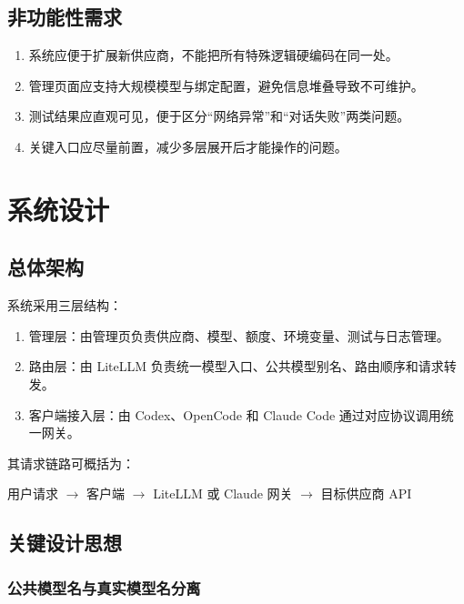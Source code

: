 \documentclass[12pt,a4paper]{ctexart}
\begin{document}
\subsection{非功能性需求}

\begin{enumerate}[label=\arabic*.]
  \item 系统应便于扩展新供应商，不能把所有特殊逻辑硬编码在同一处。
  \item 管理页面应支持大规模模型与绑定配置，避免信息堆叠导致不可维护。
  \item 测试结果应直观可见，便于区分“网络异常”和“对话失败”两类问题。
  \item 关键入口应尽量前置，减少多层展开后才能操作的问题。
\end{enumerate}

\section{系统设计}

\subsection{总体架构}

系统采用三层结构：

\begin{enumerate}[label=\arabic*.]
  \item 管理层：由管理页负责供应商、模型、额度、环境变量、测试与日志管理。
  \item 路由层：由 LiteLLM 负责统一模型入口、公共模型别名、路由顺序和请求转发。
  \item 客户端接入层：由 Codex、OpenCode 和 Claude Code 通过对应协议调用统一网关。
\end{enumerate}

其请求链路可概括为：

\begin{center}
用户请求 $\rightarrow$ 客户端 $\rightarrow$ LiteLLM 或 Claude 网关 $\rightarrow$ 目标供应商 API
\end{center}

\subsection{关键设计思想}

\subsubsection{公共模型名与真实模型名分离}
\end{document}
